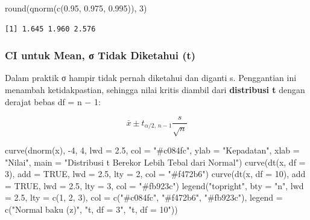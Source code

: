 \documentclass[
  indonesian,
  letterpaper,
]{book}
\newenvironment{Shaded}{\begin{snugshade}}{\end{snugshade}}
\newcommand{\AttributeTok}[1]{\textcolor[rgb]{0.40,0.45,0.13}{#1}}
\newcommand{\ConstantTok}[1]{\textcolor[rgb]{0.56,0.35,0.01}{#1}}
\newcommand{\DecValTok}[1]{\textcolor[rgb]{0.68,0.00,0.00}{#1}}
\newcommand{\FloatTok}[1]{\textcolor[rgb]{0.68,0.00,0.00}{#1}}
\newcommand{\FunctionTok}[1]{\textcolor[rgb]{0.28,0.35,0.67}{#1}}
\newcommand{\NormalTok}[1]{\textcolor[rgb]{0.00,0.23,0.31}{#1}}
\newcommand{\SpecialCharTok}[1]{\textcolor[rgb]{0.37,0.37,0.37}{#1}}
\newcommand{\StringTok}[1]{\textcolor[rgb]{0.13,0.47,0.30}{#1}}
\begin{document}
\begin{Shaded}
\begin{Highlighting}[]
\FunctionTok{round}\NormalTok{(}\FunctionTok{qnorm}\NormalTok{(}\FunctionTok{c}\NormalTok{(}\FloatTok{0.95}\NormalTok{, }\FloatTok{0.975}\NormalTok{, }\FloatTok{0.995}\NormalTok{)), }\DecValTok{3}\NormalTok{)}
\end{Highlighting}
\end{Shaded}

\begin{verbatim}
[1] 1.645 1.960 2.576
\end{verbatim}

\subsubsection{CI untuk Mean, σ Tidak Diketahui
(t)}\label{ci-untuk-mean-ux3c3-tidak-diketahui-t}

Dalam praktik σ hampir tidak pernah diketahui dan diganti s. Penggantian
ini menambah ketidakpastian, sehingga nilai kritis diambil dari
\textbf{distribusi t} dengan derajat bebas df = n − 1:

\[\bar{x} \pm t_{\alpha/2,\, n-1} \frac{s}{\sqrt{n}}\]

\begin{Shaded}
\begin{Highlighting}[]
\FunctionTok{curve}\NormalTok{(}\FunctionTok{dnorm}\NormalTok{(x), }\SpecialCharTok{{-}}\DecValTok{4}\NormalTok{, }\DecValTok{4}\NormalTok{, }\AttributeTok{lwd =} \FloatTok{2.5}\NormalTok{, }\AttributeTok{col =} \StringTok{"\#c084fc"}\NormalTok{,}
      \AttributeTok{ylab =} \StringTok{"Kepadatan"}\NormalTok{, }\AttributeTok{xlab =} \StringTok{"Nilai"}\NormalTok{,}
      \AttributeTok{main =} \StringTok{"Distribusi t Berekor Lebih Tebal dari Normal"}\NormalTok{)}
\FunctionTok{curve}\NormalTok{(}\FunctionTok{dt}\NormalTok{(x, }\AttributeTok{df =} \DecValTok{3}\NormalTok{),  }\AttributeTok{add =} \ConstantTok{TRUE}\NormalTok{, }\AttributeTok{lwd =} \FloatTok{2.5}\NormalTok{, }\AttributeTok{lty =} \DecValTok{2}\NormalTok{, }\AttributeTok{col =} \StringTok{"\#f472b6"}\NormalTok{)}
\FunctionTok{curve}\NormalTok{(}\FunctionTok{dt}\NormalTok{(x, }\AttributeTok{df =} \DecValTok{10}\NormalTok{), }\AttributeTok{add =} \ConstantTok{TRUE}\NormalTok{, }\AttributeTok{lwd =} \FloatTok{2.5}\NormalTok{, }\AttributeTok{lty =} \DecValTok{3}\NormalTok{, }\AttributeTok{col =} \StringTok{"\#fb923c"}\NormalTok{)}
\FunctionTok{legend}\NormalTok{(}\StringTok{"topright"}\NormalTok{, }\AttributeTok{bty =} \StringTok{"n"}\NormalTok{, }\AttributeTok{lwd =} \FloatTok{2.5}\NormalTok{, }\AttributeTok{lty =} \FunctionTok{c}\NormalTok{(}\DecValTok{1}\NormalTok{, }\DecValTok{2}\NormalTok{, }\DecValTok{3}\NormalTok{),}
       \AttributeTok{col =} \FunctionTok{c}\NormalTok{(}\StringTok{"\#c084fc"}\NormalTok{, }\StringTok{"\#f472b6"}\NormalTok{, }\StringTok{"\#fb923c"}\NormalTok{),}
       \AttributeTok{legend =} \FunctionTok{c}\NormalTok{(}\StringTok{"Normal baku (z)"}\NormalTok{, }\StringTok{"t, df = 3"}\NormalTok{, }\StringTok{"t, df = 10"}\NormalTok{))}
\end{Highlighting}
\end{Shaded}
\end{document}
